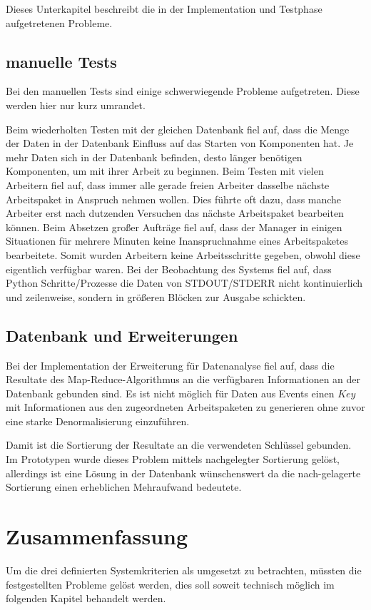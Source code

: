 Dieses Unterkapitel  beschreibt die in der Implementation und Testphase aufgetretenen Probleme.

\subsection{manuelle Tests}

Bei den manuellen Tests sind einige schwerwiegende Probleme aufgetreten.
Diese werden hier nur kurz umrandet.

\begin{description}
        Beim wiederholten Testen mit der gleichen Datenbank fiel auf, dass die Menge der Daten in der Datenbank Einfluss auf das Starten von Komponenten hat. Je mehr Daten sich in der Datenbank befinden, desto länger benötigen Komponenten, um mit ihrer Arbeit zu beginnen.
        Beim Testen mit vielen Arbeitern fiel auf, dass immer alle gerade freien Arbeiter dasselbe nächste Arbeitspaket in Anspruch nehmen wollen. Dies führte oft dazu, dass manche Arbeiter erst nach dutzenden Versuchen das nächste Arbeitspaket bearbeiten können.
        Beim Absetzen großer Aufträge fiel auf, dass der Manager in einigen Situationen für mehrere Minuten keine Inanspruchnahme eines Arbeitspaketes bearbeitete. Somit wurden Arbeitern keine Arbeitsschritte gegeben, obwohl diese eigentlich verfügbar waren.
        Bei der Beobachtung des Systems fiel auf, dass Python Schritte/Prozesse
        die Daten von STDOUT/STDERR nicht kontinuierlich und zeilenweise,
        sondern in größeren Blöcken zur Ausgabe schickten.
\end{description}


\subsection{Datenbank und Erweiterungen}

Bei der Implementation der Erweiterung für Datenanalyse fiel auf,
dass die Resultate des Map-Reduce-Algorithmus an die verfügbaren Informationen an der Datenbank gebunden sind.
Es ist nicht möglich für Daten aus Events einen $Key$ mit Informationen aus den zugeordneten Arbeitspaketen zu generieren ohne zuvor eine starke Denormalisierung einzuführen.

Damit ist die Sortierung der Resultate an die verwendeten Schlüssel gebunden. 
Im Prototypen wurde dieses Problem mittels nachgelegter Sortierung gelöst,
allerdings ist eine Lösung in der Datenbank wünschenswert da die nach-gelagerte Sortierung einen erheblichen Mehraufwand bedeutete.


\section{Zusammenfassung}
Um die drei definierten Systemkriterien als umgesetzt zu betrachten,
müssten die festgestellten Probleme gelöst werden,
dies soll soweit technisch möglich im folgenden Kapitel behandelt werden.

